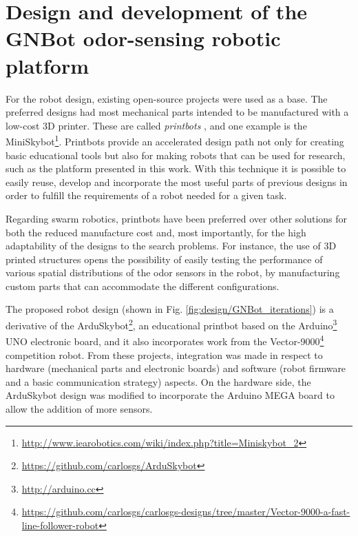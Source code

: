 \chapter{Design and development of the GNBot odor-sensing robotic platform}
\label{chap:design}
\vspace{-1cm}


For the robot design, existing open-source projects were used as a base. The preferred designs had most mechanical parts intended to be manufactured with a low-cost 3D printer. These are called \emph{printbots} \cite{GonzalezValero11miniskybot, ValeroGonzalez12creativity, ValeroGonzalezOOML12}, and one example is the MiniSkybot\footnote{\url{http://www.iearobotics.com/wiki/index.php?title=Miniskybot\_2}}. Printbots provide an accelerated design path not only for creating basic educational tools \cite{Garcia-Saura2012} but also for making robots that can be used for research, such as the platform presented in this work.
With this technique it is possible to easily reuse, develop and incorporate the most useful parts of previous designs in order to fulfill the requirements of a robot needed for a given task.

Regarding swarm robotics, printbots have been preferred over other solutions for both the reduced manufacture cost and, most importantly, for the high adaptability of the designs to the search problems. For instance, the use of 3D printed structures opens the possibility of easily testing the performance of various spatial distributions of the odor sensors in the robot, by manufacturing custom parts that can accommodate the different configurations.




The proposed robot design (shown in Fig. \ref{fig:design/GNBot_iterations}) is a derivative of the ArduSkybot\footnote{\url{https://github.com/carlosgs/ArduSkybot}}, an educational printbot based on the Arduino\footnote{\url{http://arduino.cc}} UNO electronic board, and it also incorporates work from the Vector-9000\footnote{\url{https://github.com/carlosgs/carlosgs-designs/tree/master/Vector-9000-a-fast-line-follower-robot}} competition robot. 
From these projects, integration was made in respect to hardware (mechanical parts and electronic boards) and software (robot firmware and a basic communication strategy) aspects.
On the hardware side, the ArduSkybot design was modified to incorporate the Arduino MEGA board to allow the addition of more sensors.


